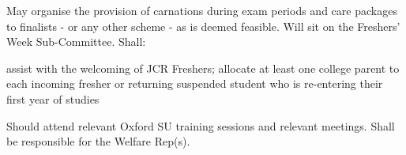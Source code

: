 May organise the provision of carnations during exam periods and care packages to finalists - or any other scheme - as is deemed feasible.
Will sit on the Freshers' Week Sub-Committee. Shall:\begin{enumerate}
assist with the welcoming of JCR Freshers;
allocate at least one college parent to each incoming fresher or returning suspended student who is re-entering their first year of studies\end{enumerate}
Should attend relevant Oxford SU training sessions and relevant meetings.
Shall be responsible for the Welfare Rep(s).

